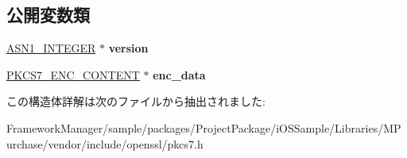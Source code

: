 \subsection*{公開変数類}
\begin{DoxyCompactItemize}
\item 
\hypertarget{structpkcs7__signedandenveloped__st_afa74cdf71197c1a7cdc53b1ee662802c}{}\hyperlink{structasn1__string__st}{A\+S\+N1\+\_\+\+I\+N\+T\+E\+G\+E\+R} $\ast$ {\bfseries version}\label{structpkcs7__signedandenveloped__st_afa74cdf71197c1a7cdc53b1ee662802c}

\item 
\hypertarget{structpkcs7__signedandenveloped__st_a13b7235eaaab4212ab646d69c10c8012}{}\hyperlink{structpkcs7__enc__content__st}{P\+K\+C\+S7\+\_\+\+E\+N\+C\+\_\+\+C\+O\+N\+T\+E\+N\+T} $\ast$ {\bfseries enc\+\_\+data}\label{structpkcs7__signedandenveloped__st_a13b7235eaaab4212ab646d69c10c8012}

\end{DoxyCompactItemize}


この構造体詳解は次のファイルから抽出されました\+:\begin{DoxyCompactItemize}
\item 
Framework\+Manager/sample/packages/\+Project\+Package/i\+O\+S\+Sample/\+Libraries/\+M\+Purchase/vendor/include/openssl/pkcs7.\+h\end{DoxyCompactItemize}
